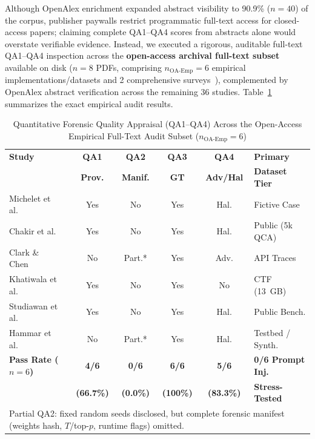 Although OpenAlex enrichment expanded abstract visibility to 90.9\% ($n=40$) of the corpus, publisher paywalls restrict programmatic full-text access for closed-access papers; claiming complete QA1--QA4 scores from abstracts alone would overstate verifiable evidence. Instead, we executed a rigorous, auditable full-text QA1--QA4 inspection across the \textbf{open-access archival full-text subset} available on disk ($n=8$ PDFs, comprising $n_{\text{OA-Emp}}=6$ empirical implementations/datasets and 2 comprehensive surveys~\cite{jelodar2026_large, wickramasekara2025_exploring}), complemented by OpenAlex abstract verification across the remaining 36 studies. Table~\ref{tab:qa_audit} summarizes the exact empirical audit results.

\begin{table}[!t]
\caption{Quantitative Forensic Quality Appraisal (QA1--QA4) Across the Open-Access Empirical Full-Text Audit Subset ($n_{\text{OA-Emp}}=6$)}
\label{tab:qa_audit}
\centering
\scriptsize
\setlength{\tabcolsep}{2pt}
\begin{tabular}{lccccp{1.75cm}}
\toprule
\textbf{Study} & \textbf{QA1} & \textbf{QA2} & \textbf{QA3} & \textbf{QA4} & \textbf{Primary} \\
 & \textbf{Prov.} & \textbf{Manif.} & \textbf{GT} & \textbf{Adv/Hal} & \textbf{Dataset Tier} \\
\midrule
Michelet et al.~\cite{michelet2024_chatgpt} & Yes & No & Yes & Hal. & Fictive Case \\
Chakir et al.~\cite{chakir2025_forensicsdata} & Yes & No & Yes & Hal. & Public (5k QCA) \\
Clark \& Chen~\cite{clark2025_large} & No & Part.* & Yes & Adv. & API Traces \\
Khatiwala et al.~\cite{khatiwala2025_evaluating} & Yes & No & Yes & No & CTF (13~GB) \\
Studiawan et al.~\cite{studiawan2025_towards} & Yes & No & Yes & Hal. & Public Bench. \\
Hammar et al.~\cite{hammar2026_incident} & No & Part.* & Yes & Hal. & Testbed / Synth. \\
\midrule
\textbf{Pass Rate ($n=6$)} & \textbf{4/6} & \textbf{0/6} & \textbf{6/6} & \textbf{5/6} & \textbf{0/6 Prompt Inj.} \\
 & \textbf{(66.7\%)} & \textbf{(0.0\%)} & \textbf{(100\%)} & \textbf{(83.3\%)} & \textbf{Stress-Tested} \\
\bottomrule
\multicolumn{6}{p{7.8cm}}{\tiny *Partial QA2: fixed random seeds disclosed, but complete forensic manifest (weights hash, $T$/top-$p$, runtime flags) omitted.}
\end{tabular}
\end{table}

